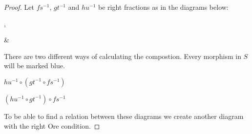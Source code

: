     \begin{proof}
        Let $fs^{-1}$, $gt^{-1}$ and $hu^{-1}$ be right fractions as in the diagrams below:
        \begin{center}
            ,
            \&
        \end{center}
        There are two different ways of calculating the compostion. Every morphism in $S$ will be marked blue.
        \begin{center}
            \begin{minipage}[c]{0.4\textwidth}
                \underline{$hu^{-1}\circ (gt^{-1}\circ fs^{-1})$}\\
            \end{minipage}
            \begin{minipage}[c]{0.4\textwidth}
                \underline{$(hu^{-1}\circ gt^{-1})\circ fs^{-1}$}\\
            \end{minipage}
        \end{center}
        To be able to find a relation between these diagrams we create another diagram with the right Ore condition.

\end{proof}
